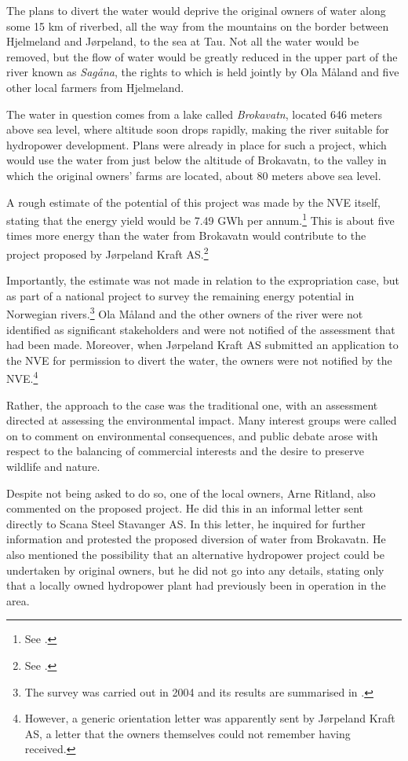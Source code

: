 The plans to divert the water would deprive the original owners of water along some 15 km of riverbed, all the way from the mountains on the border between Hjelmeland and Jørpeland, to the sea at Tau. Not all the water would be removed, but the flow of water would be greatly reduced in the upper part of the river known as {\it Sagåna}, the rights to which is held jointly by Ola Måland and five other local farmers from Hjelmeland.

The water in question comes from a lake called \emph{Brokavatn}, located 646 meters above sea level, where altitude soon drops rapidly, making the river suitable for hydropower development. Plans were already in place for such a project, which would use the water from just below the altitude of Brokavatn, to the valley in which the original owners' farms are located, about 80 meters above sea level. 

A rough estimate of the potential of this project was made by the NVE itself, stating that the energy yield would be 7.49 GWh per annum.\footnote{See \cite{jorpeland09}.} This is about five times more energy than the water from Brokavatn would contribute to the project proposed by Jørpeland Kraft AS.\footnote{See \cite{jorpeland09}.}

Importantly, the estimate was not made in relation to the expropriation case, but as part of a national project to survey the remaining energy potential in Norwegian rivers.\footnote{The survey was carried out in 2004 and its results are summarised in \cite{jensen04}.} Ola Måland and the other owners of the river were not identified as significant stakeholders and were not notified of the assessment that had been made. Moreover, when Jørpeland Kraft AS submitted an application to the NVE for permission to divert the water, the owners were not notified by the NVE.\footnote{However, a generic orientation letter was apparently sent by Jørpeland Kraft AS, a letter that the owners themselves could not remember having received.}

Rather, the approach to the case was the traditional one, with an assessment directed  at assessing the environmental impact. Many interest groups were called on to comment on environmental consequences, and public debate arose with respect to the balancing of commercial interests and the desire to preserve wildlife and nature.

Despite not being asked to do so, one of the local owners, Arne Ritland, also commented on the proposed project. He did this in an informal letter sent directly to Scana Steel Stavanger AS. In this letter, he inquired for further information and protested the proposed diversion of water from Brokavatn. He also mentioned the possibility that an alternative hydropower project could be undertaken by original owners, but he did not go into any details, stating only that a locally owned hydropower plant had previously been in operation in the area. 


